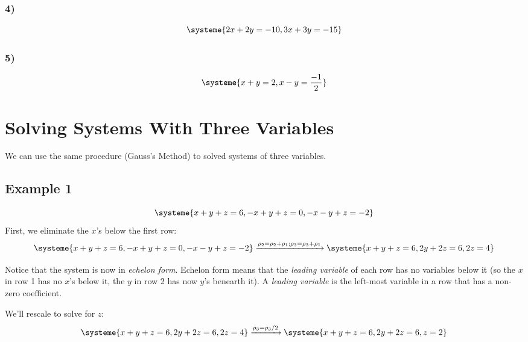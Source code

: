 \documentclass[a4paper,twoside,12pt]{memoir}  %
\begin{document}
\subsubsection{4)}
\begin{equation*} %
  \systeme{
    2x + 2y = -10,
    3x + 3y = -15
  }
\end{equation*}

\subsubsection{5)}
\begin{equation*} %
  \systeme{
    x + y = 2,
    x - y = \frac{-1}{2}
  }
\end{equation*}

\section{Solving Systems With Three Variables}
We can use the same procedure (Gauss's Method) to solved systems of three variables.

\subsection{Example 1}
\begin{equation*} %
  \systeme{
     x + y + z = 6,
    -x + y + z = 0,
    -x - y + z = -2
  }
\end{equation*}
First, we eliminate the $x$'s below the first row:
\begin{equation*}
  \systeme{
     x + y + z = 6,
    -x + y + z = 0,
    -x - y + z = -2
  }
  \xrightarrow{\rho_2 = \rho_2 + \rho_1; \rho_3 = \rho_3 + \rho_1}
  \systeme{
     x + y + z = 6,
        2y + 2z = 6,
             2z = 4
  }
\end{equation*}

Notice that the system is now in \textit{echelon form}.
Echelon form means that the \textit{leading variable} of each row has no variables below it
(so the $x$ in row 1 has no $x$'s below it, the $y$ in row 2 has now $y$'s benearth it).
A \textit{leading variable} is the left-most variable in a row that has a non-zero coefficient.

We'll rescale to solve for $z$:
\begin{equation*}
  \systeme{
     x + y + z = 6,
        2y + 2z = 6,
             2z = 4
  }
  \xrightarrow{\rho_3 = \rho_3/2}
  \systeme{
     x + y + z = 6,
        2y + 2z = 6,
              z = 2
  }
\end{equation*}
\end{document}
